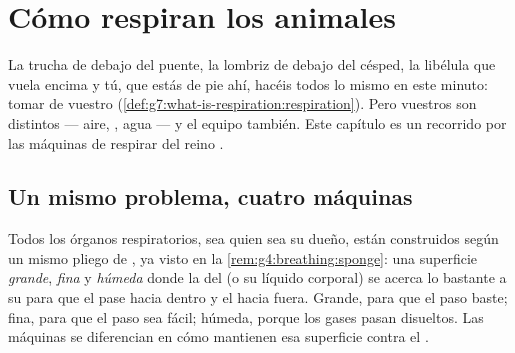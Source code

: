 \chapter{Cómo respiran los animales}\label{ch:g7:how-animals-breathe}

La trucha de debajo del puente, la lombriz de debajo del césped, la
libélula que vuela encima y tú, que estás de pie ahí, hacéis todos lo
mismo en este minuto: tomar  de vuestro 
(\cref{def:g7:what-is-respiration:respiration}). Pero vuestros 
son distintos --- aire, , agua --- y el equipo también. Este
capítulo es un recorrido por las máquinas de respirar del reino .

\section{Un mismo problema, cuatro máquinas}

\begin{proposition}\label{prop:g7:how-animals-breathe:spec}
Todos los órganos respiratorios, sea quien sea su dueño, están
construidos según un mismo pliego de , ya visto en la
\cref{rem:g4:breathing:sponge}: una superficie \emph{grande},
\emph{fina} y \emph{húmeda} donde la  del  (o su líquido
corporal) se acerca lo bastante a su  para que el  pase
hacia dentro y el  hacia fuera. Grande, para que el
paso baste; fina, para que el paso sea fácil; húmeda, porque los gases
pasan disueltos. Las máquinas se diferencian en cómo mantienen esa
superficie contra el .
\end{proposition}
\admitted

